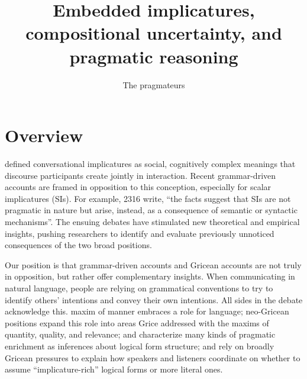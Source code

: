 \documentclass{article}
\begin{document}

\title{Embedded implicatures, compositional uncertainty, and pragmatic reasoning}
\author{The pragmateurs}
\maketitle


\section{Overview}\label{sec:introduction}

\citet{Grice75} defined conversational implicatures as social,
cognitively complex meanings that discourse participants create
jointly in interaction. Recent grammar-driven accounts are framed in
opposition to this conception, especially for scalar implicatures
(SIs).  For example, \citet{ChierchiaFoxSpector08}{2316} write, ``the
facts suggest that SIs are not pragmatic in nature but arise, instead,
as a consequence of semantic or syntactic mechanisms''. The ensuing
debates have stimulated new theoretical and empirical insights,
pushing researchers to identify and evaluate previously unnoticed
consequences of the two broad positions.

Our position is that grammar-driven accounts and Gricean accounts are
not truly in opposition, but rather offer complementary insights.
When communicating in natural language, people are relying on
grammatical conventions to try to identify others' intentions and
convey their own intentions. All sides in the debate acknowledge this.
 maxim of manner embraces a role for language;
neo-Gricean positions expand this role into areas Grice addressed with
the maxims of quantity, quality, and relevance; \citet{Sperber95} and
\citet{Bach94} characterize many kinds of pragmatic enrichment as
inferences about logical form structure; and
\citet{ChierchiaFoxSpector08} rely on broadly Gricean pressures to
explain how speakers and listeners coordinate on whether to assume
``implicature-rich'' logical forms or more literal ones.
\end{document}
